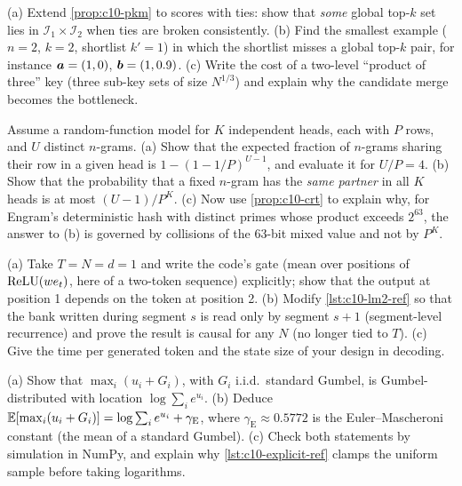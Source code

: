\begin{exercise}\label{exr:c10-pkm}
(a) Extend \cref{prop:c10-pkm} to scores with ties: show that \emph{some} global top-$k$ set lies
in $\mathcal{I}_1 \times \mathcal{I}_2$ when ties are broken consistently. (b) Find the smallest
example ($n = 2$, $k = 2$, shortlist $k' = 1$) in which the shortlist misses a global top-$k$ pair,
for instance $\bm{a} = (1, 0)$, $\bm{b} = (1, 0.9)$. (c) Write the cost of a two-level ``product of
three'' key (three sub-key sets of size $N^{1/3}$) and explain why the candidate merge becomes the
bottleneck.
\end{exercise}

\begin{exercise}\label{exr:c10-hash}
Assume a random-function model for $K$ independent heads, each with $P$ rows, and $U$ distinct
$n$-grams. (a) Show that the expected fraction of $n$-grams sharing their row in a given head is
$1 - (1-1/P)^{U-1}$, and evaluate it for $U/P = 4$. (b) Show that the probability that a fixed
$n$-gram has the \emph{same partner} in all $K$ heads is at most $(U-1)/P^K$. (c) Now use
\cref{prop:c10-crt} to explain why, for Engram's deterministic hash with distinct primes whose
product exceeds $2^{63}$, the answer to (b) is governed by collisions of the 63-bit mixed value and
not by $P^K$.
\end{exercise}

\begin{exercise}[A causal LM2]\label{exr:c10-lm2}
(a) Take $T = N = d = 1$ and write the code's gate (mean over positions of $\operatorname{ReLU}(w e_t)$, here of a
two-token sequence) explicitly; show that the output at position 1 depends on the token at
position 2. (b) Modify \cref{lst:c10-lm2-ref} so that the bank written during segment $s$ is read
only by segment $s+1$ (segment-level recurrence) and prove the result is causal for any $N$ (no
longer tied to $T$). (c) Give the time per generated token and the state size of your design in
decoding.
\end{exercise}

\begin{exercise}\label{exr:c10-gumbel}
(a) Show that $\max_i (u_i + G_i)$, with $G_i$ i.i.d.\ standard Gumbel, is Gumbel-distributed with
location $\log\sum_i e^{u_i}$. (b) Deduce $\mathbb{E}[\max_i(u_i + G_i)] = \log\sum_i e^{u_i} + \gamma_{\mathrm{E}}$,
where $\gamma_{\mathrm{E}} \approx 0.5772$ is the Euler--Mascheroni constant (the mean of a standard
Gumbel). (c) Check both statements by simulation in NumPy, and explain why
\cref{lst:c10-explicit-ref} clamps the uniform sample before taking logarithms.
\end{exercise}

